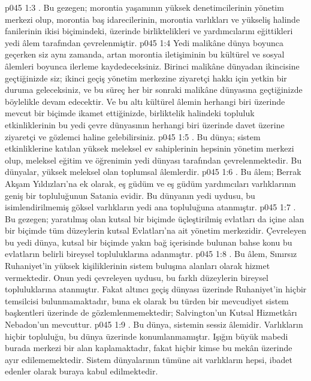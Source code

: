 \vs p045 1:3 . Bu gezegen; morontia yaşamının yüksek denetimcilerinin yönetim merkezi olup, morontia baş idarecilerinin, morontia varlıkları ve yükseliş halinde fanilerinin ikisi biçimindeki, üzerinde birliktelikleri ve yardımcılarını eğittikleri yedi âlem tarafından çevrelenmiştir.
\vs p045 1:4 Yedi malikâne dünya boyunca geçerken siz aynı zamanda, artan morontia iletişiminin bu kültürel ve sosyal âlemleri boyunca ilerleme kaydedeceksiniz. Birinci malikâne dünyadan ikincisine geçtiğinizde siz; ikinci geçiş yönetim merkezine ziyaretçi hakkı için yetkin bir duruma geleceksiniz, ve bu süreç her bir sonraki malikâne dünyasına geçtiğinizde böylelikle devam edecektir. Ve bu altı kültürel âlemin herhangi biri üzerinde mevcut bir biçimde ikamet ettiğinizde, birliktelik halindeki topluluk etkinliklerinin bu yedi çevre dünyasının herhangi biri üzerinde davet üzerine ziyaretçi ve gözlemci haline gelebilirsiniz.
\vs p045 1:5 . Bu dünya; sistem etkinliklerine katılan yüksek meleksel ev sahiplerinin hepsinin yönetim merkezi olup, meleksel eğitim ve öğrenimin yedi dünyası tarafından çevrelenmektedir. Bu dünyalar, yüksek meleksel olan toplumsal âlemlerdir.
\vs p045 1:6 . Bu âlem; Berrak Akşam Yıldızları’na ek olarak, eş güdüm ve eş güdüm yardımcıları varlıklarının geniş bir topluluğunun Satania evidir. Bu dünyanın yedi uydusu, bu isimlendirilmemiş göksel varlıkların yedi ana topluluğuna atanmıştır.
\vs p045 1:7 . Bu gezegen; yaratılmış olan kutsal bir biçimde üçleştirilmiş evlatları da içine alan bir biçimde tüm düzeylerin kutsal Evlatları’na ait yönetim merkezidir. Çevreleyen bu yedi dünya, kutsal bir biçimde yakın bağ içerisinde bulunan bahse konu bu evlatların belirli bireysel topluluklarına adanmıştır.
\vs p045 1:8 . Bu âlem, Sınırsız Ruhaniyet’in yüksek kişiliklerinin sistem buluşma alanları olarak hizmet vermektedir. Onun yedi çevreleyen uydusu, bu farklı düzeylerin bireysel topluluklarına atanmıştır. Fakat altıncı geçiş dünyası üzerinde Ruhaniyet’in hiçbir temsilcisi bulunmamaktadır, buna ek olarak bu türden bir mevcudiyet sistem başkentleri üzerinde de gözlemlenmemektedir; Salvington’un Kutsal Hizmetkârı Nebadon’un  mevcuttur.
\vs p045 1:9 . Bu dünya, sistemin sessiz âlemidir. Varlıkların hiçbir topluluğu, bu dünya üzerinde konumlanmamıştır. Işığın büyük mabedi burada merkezi bir alan kaplamaktadır, fakat hiçbir kimse bu mekân üzerinde ayır edilememektedir. Sistem dünyalarının tümüne ait varlıkların hepsi, ibadet edenler olarak buraya kabul edilmektedir.
